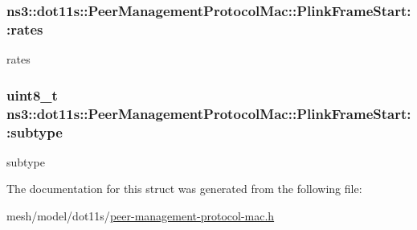 \subsubsection[{\texorpdfstring{rates}{rates}}]{ ns3\+::dot11s\+::\+Peer\+Management\+Protocol\+Mac\+::\+Plink\+Frame\+Start\+::rates}\hypertarget{structns3_1_1dot11s_1_1PeerManagementProtocolMac_1_1PlinkFrameStart_a64600aead58f1ab5c2c5313f7fbeaca3}{}\label{structns3_1_1dot11s_1_1PeerManagementProtocolMac_1_1PlinkFrameStart_a64600aead58f1ab5c2c5313f7fbeaca3}


rates 

\subsubsection[{\texorpdfstring{subtype}{subtype}}]{\setlength{\rightskip}{0pt plus 5cm}uint8\+\_\+t ns3\+::dot11s\+::\+Peer\+Management\+Protocol\+Mac\+::\+Plink\+Frame\+Start\+::subtype}\hypertarget{structns3_1_1dot11s_1_1PeerManagementProtocolMac_1_1PlinkFrameStart_a43bfe58939704c3c247b6f5dd070e1f9}{}\label{structns3_1_1dot11s_1_1PeerManagementProtocolMac_1_1PlinkFrameStart_a43bfe58939704c3c247b6f5dd070e1f9}


subtype 



The documentation for this struct was generated from the following file\+:\begin{DoxyCompactItemize}
\item 
mesh/model/dot11s/\hyperlink{peer-management-protocol-mac_8h}{peer-\/management-\/protocol-\/mac.\+h}\end{DoxyCompactItemize}
